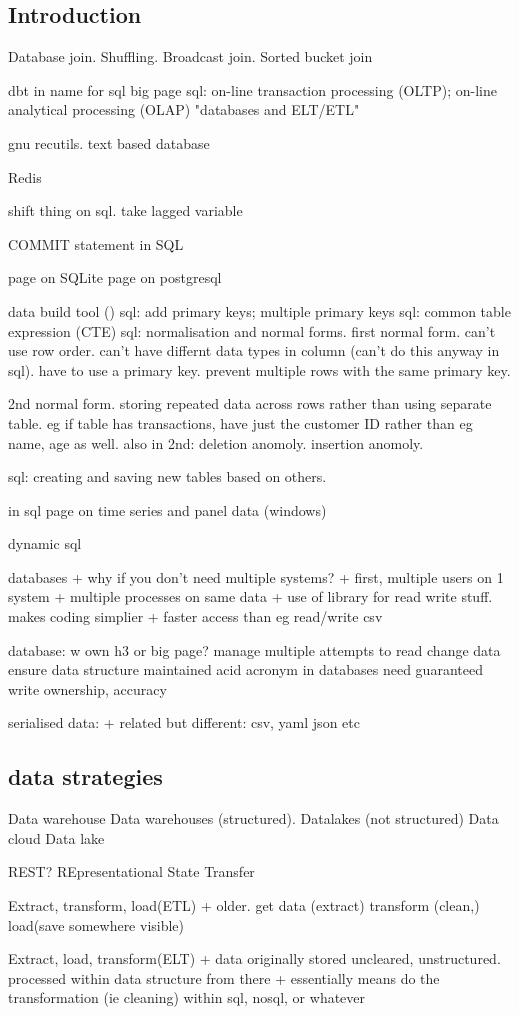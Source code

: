 
\subsection{Introduction}

Database join. Shuffling. Broadcast join. Sorted bucket join

dbt in name for sql big page
sql: on-line transaction processing (OLTP); on-line analytical processing (OLAP)
"databases and ELT/ETL"

gnu recutils. text based database

Redis

shift thing on sql. take lagged variable

COMMIT statement in SQL

page on SQLite
page on postgresql

data build tool ()
sql: add primary keys; multiple primary keys
sql: common table expression (CTE)
sql: normalisation and normal forms. first normal form. can't use row order. can't have differnt data types in column (can't do this anyway in sql). have to use a primary key. prevent multiple rows with the same primary key.

2nd normal form. storing repeated data across rows rather than using separate table. eg if table has transactions, have just the customer ID rather than eg name, age as well.
also in 2nd: deletion anomoly. insertion anomoly.

sql: creating and saving new tables based on others.

in sql page on time series and panel data (windows)

dynamic sql

databases
+ why if you don't need multiple systems?
+ first, multiple users on 1 system
+ multiple processes on same data
+ use of library for read write stuff. makes coding simplier
+ faster access than eg read/write csv

database:
w own h3 or big page?
manage multiple attempts to read change data
ensure data structure maintained
acid acronym in databases
need guaranteed write ownership, accuracy

serialised data:
+ related but different: csv, yaml json etc
\subsection{data strategies}
Data warehouse
Data warehouses (structured). Datalakes (not structured)
Data cloud
Data lake

REST? REpresentational State Transfer

Extract, transform, load(ETL)
+ older. get data (extract) transform (clean,) load(save somewhere visible)

Extract, load, transform(ELT)
+ data originally stored uncleared, unstructured. processed within data structure from there
+ essentially means do the transformation (ie cleaning) within sql, nosql, or whatever

